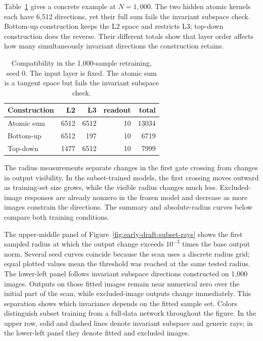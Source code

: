 Table~\ref{tab:subset-order} gives a concrete example at $N=1{,}000$. The two hidden atomic kernels each have 6,512 directions, yet their full sum fails the invariant subspace check. Bottom-up construction keeps the L2 space and restricts L3; top-down construction does the reverse. Their different totals show that layer order affects how many simultaneously invariant directions the construction retains.
\begin{table}[!htbp]\centering
\caption{Compatibility in the 1,000-sample retraining, seed 0. The input layer is fixed. The atomic sum is a tangent space but fails the invariant subspace check.}\label{tab:subset-order}
\begin{tabular}{lrrrr}\toprule
Construction & L2 & L3 & readout & total\\\midrule
Atomic sum &6512&6512&10&13034\\
Bottom-up &6512&197&10&6719\\
Top-down &1477&6512&10&7999\\\bottomrule
\end{tabular}\end{table}

The radius measurements separate changes in the first gate crossing from changes in output visibility. In the subset-trained models, the first crossing moves outward as training-set size grows, while the visible radius changes much less. Excluded-image responses are already nonzero in the frozen model and decrease as more images constrain the directions. The summary and absolute-radius curves below compare both training conditions.

The upper-middle panel of Figure~\ref{fig:early-draft-subset-rays} shows the first sampled radius at which the output change exceeds $10^{-3}$ times the base output norm. Several seed curves coincide because the scan uses a discrete radius grid; equal plotted values mean the threshold was reached at the same tested radius. The lower-left panel follows invariant subspace directions constructed on 1,000 images. Outputs on those fitted images remain near numerical zero over the initial part of the scan, while excluded-image outputs change immediately. This separation shows which invariance depends on the fitted sample set. Colors distinguish subset training from a full-data network throughout the figure. In the upper row, solid and dashed lines denote invariant subspace and generic rays; in the lower-left panel they denote fitted and excluded images.


